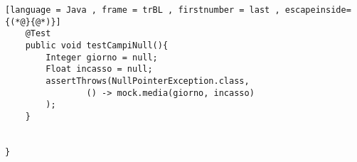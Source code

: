 \begin{lstlisting}[language = Java , frame = trBL , firstnumber = last , escapeinside={(*@}{@*)}]
    @Test
    public void testCampiNull(){
        Integer giorno = null;
        Float incasso = null;
        assertThrows(NullPointerException.class,
                () -> mock.media(giorno, incasso)
        );
    }


}

\end{lstlisting}



